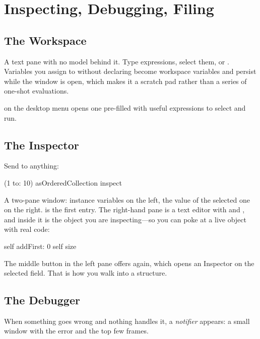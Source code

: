 \chapter{Inspecting, Debugging, Filing}
\label{ch:tools}


\section{The Workspace}

A text pane with no model behind it. Type expressions, select them, 
or . Variables you assign to without declaring become workspace
variables and persist while the window is open, which makes it a scratch pad
rather than a series of one-shot evaluations.

 on the desktop menu opens one pre-filled with useful
expressions to select and run.

\section{The Inspector}

Send  to anything:

\begin{st}
(1 to: 10) asOrderedCollection inspect
\end{st}

A two-pane window: instance variables on the left, the value of the selected
one on the right.  is the first entry. The right-hand pane is a text
editor with  and , and inside it  is the
object you are inspecting---so you can poke at a live object with real code:

\begin{st}
self addFirst: 0
self size
\end{st}

The middle button in the left pane offers  again, which opens an
Inspector on
the selected field. That is how you walk into a structure.

\section{The Debugger}

When something goes wrong and nothing handles it, a \emph{notifier} appears: a
small window with the error and the top few frames.

